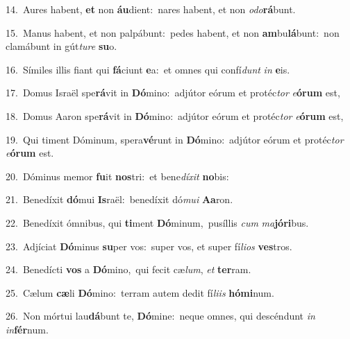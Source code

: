 {\numbfont\textcolor{\numbcolor}{14.}}~Aures habent, \textbf{et} non \textbf{áu}\-dient:~\star nares habent, et non \textit{o}\-\textit{do}\textbf{rá}bunt.\par
{\numbfont\textcolor{\numbcolor}{15.}}~Manus habent, et non palpábunt:~\dagger pedes habent, et non \textbf{am}\-bu\-\textbf{lá}\-bunt:~\star non clamábunt in gút\-\textit{tu}\-\textit{re} \textbf{su}\-o.\par
{\numbfont\textcolor{\numbcolor}{16.}}~Símiles illis fiant qui \textbf{fá}\-ciunt \textbf{e}\-a:~\star et omnes qui confí\textit{dunt} \textit{in} \textbf{e}\-is.\par
{\numbfont\textcolor{\numbcolor}{17.}}~Domus Israël spe\-\textbf{rá}\-vit in \textbf{Dó}\-mino:~\star adjútor eórum et protéc\textit{tor} \textit{e}\-\textbf{ó}\textbf{rum} est,\par
{\numbfont\textcolor{\numbcolor}{18.}}~Domus Aaron spe\-\textbf{rá}\-vit in \textbf{Dó}\-mino:~\star adjútor eórum et protéc\textit{tor} \textit{e}\-\textbf{ó}\textbf{rum} est,\par
{\numbfont\textcolor{\numbcolor}{19.}}~Qui timent Dóminum, spera\-\textbf{vé}\-runt in \textbf{Dó}\-mino:~\star adjútor eórum et protéc\textit{tor} \textit{e}\-\textbf{ó}\textbf{rum} est.\par
{\numbfont\textcolor{\numbcolor}{20.}}~Dóminus memor \textbf{fu}\-it \textbf{nos}\-tri:~\star et bene\-\textit{dí}\-\textit{xit} \textbf{no}\-bis:\par
{\numbfont\textcolor{\numbcolor}{21.}}~Benedíxit \textbf{dó}\-mui \textbf{Is}\-raël:~\star benedíxit dó\-\textit{mu}\-\textit{i} \textbf{A}\-\textbf{a}ron.\par
{\numbfont\textcolor{\numbcolor}{22.}}~Benedíxit ómnibus, qui \textbf{ti}\-ment \textbf{Dó}\-minum,~\star pusíllis \textit{cum} \textit{ma}\-\textbf{jó}\textbf{ri}bus.\par
{\numbfont\textcolor{\numbcolor}{23.}}~Adjíciat \textbf{Dó}\-minus \textbf{su}\-per vos:~\star super vos, et super fí\-\textit{li}\-\textit{os} \textbf{ves}\-tros.\par
{\numbfont\textcolor{\numbcolor}{24.}}~Benedícti \textbf{vos} a \textbf{Dó}\-mino,~\star qui fecit cæ\-\textit{lum}\-, \textit{et} \textbf{ter}\-ram.\par
{\numbfont\textcolor{\numbcolor}{25.}}~Cælum \textbf{cæ}\-li \textbf{Dó}\-mino:~\star terram autem dedit fí\-\textit{li}\-\textit{is} \textbf{hó}\-\textbf{mi}num.\par
{\numbfont\textcolor{\numbcolor}{26.}}~Non mórtui lau\-\textbf{dá}\-bunt te, \textbf{Dó}\-mine:~\star neque omnes, qui descéndunt \textit{in} \textit{in}\-\textbf{fér}num.\par

